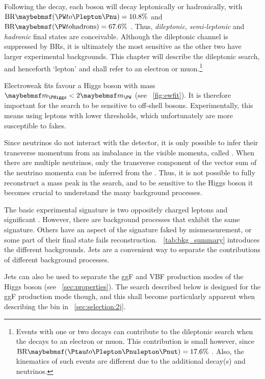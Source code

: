 
Following the \HWW decay, each \PW boson will decay leptonically or hadronically, with 
$\text{BR}\parenths{\HepProcess{\PW\HepTo\Plepton\Pnu}} = 10.8\%$ and 
$\text{BR}\parenths{\HepProcess{\PW\HepTo \text{hadrons}}} = 67.6\%$ \cite{PDG:2012}. 
Thus, \textit{dileptonic}, \textit{semi-leptonic} and \textit{hadronic} final states are 
conceivable. Although the dileptonic channel is suppressed by \acp{BR}, it is ultimately 
the most sensitive as the other two have larger experimental backgrounds. This chapter 
will describe the dileptonic search, and henceforth 
`lepton' and \Plepton shall refer to an electron or muon.\footnote{
	Events with one or two \HepProcess{\PW\HepTo\Ptau\Pnu} decays can 
	contribute to the dileptonic search when the \Ptau decays to an electron or muon. This 
	contribution is small however, since
	$\text{BR}\parenths{\HepProcess{\Ptau\HepTo\Plepton\Pnulepton\Pnut}} = 17.6\%$ 
	\cite{PDG:2012}. Also, the kinematics of such events are different due to the 
	additional decay(s) and neutrinos.
}

Electroweak fits favour a Higgs boson with mass $\mH < 2\mW$ (see \Figure~\ref{fig:ewfit}).
It is therefore important for the \HWW search to be sensitive to off-shell \PW bosons. 
Experimentally, this means using leptons with lower \pt thresholds, which unfortunately 
are more susceptible to fakes.

Since neutrinos do not interact with the detector, it is only possible to infer their 
transverse momentum from an imbalance in the visible momenta, called \met. When there are 
multiple neutrinos, only the transverse component of the vector sum of the neutrino 
momenta can be inferred from the \met. Thus, it is not possible to fully reconstruct a 
mass peak in the \HWWlvlv search, and to be sensitive to the Higgs boson it becomes 
crucial to understand the many background processes.

The basic experimental signature is two oppositely charged leptons and significant \met. 
However, there are background processes that exhibit the same signature. Others have an 
aspect of the signature faked by mismeasurement, or some part of their final state fails 
reconstruction. \Table~\ref{tab:bkg_summary} introduces the different backgrounds. Jets 
are a convenient way to separate the contributions of different background processes.

Jets can also be used to separate the \ac{ggF} and \ac{VBF} production modes of the Higgs 
boson (see \Section~\ref{sec:properties}). The search described below is designed for the 
\ac{ggF} production mode though, and this shall become particularly apparent when 
describing the \twojet bin in \Section~\ref{sec:selection:2j}.

